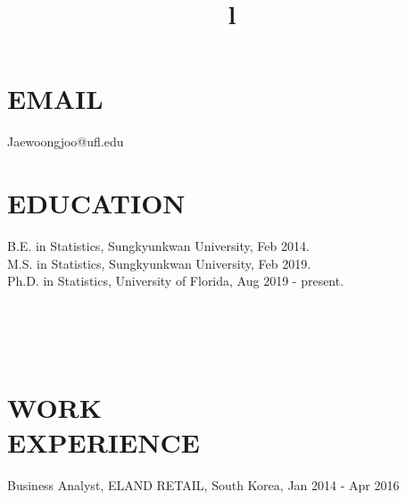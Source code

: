 \documentclass[margin]{res}
\begin{document}


\begin{resume}

\section{EMAIL}
Jaewoongjoo@ufl.edu
\section{EDUCATION}
B.E. in Statistics, Sungkyunkwan University, Feb  2014.\\
M.S. in Statistics, Sungkyunkwan University, Feb 2019.\\
Ph.D. in Statistics, University of Florida, Aug 2019 - present.


\begin{format}
\title{l}\\
\\
\body\\
\end{format}

\section{WORK \\ EXPERIENCE}
Business Analyst, ELAND RETAIL, South Korea, Jan 2014 - Apr 2016\\
\\


\end{resume}
\end{document}
